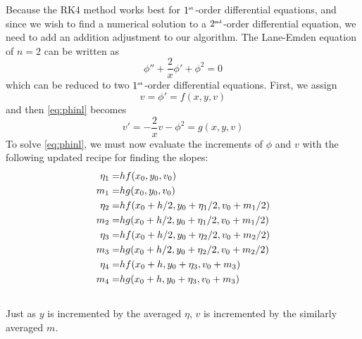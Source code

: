 \documentclass[12pt, manuscript]{article}
\begin{document}
    \noindent Because the RK4 method works best for $1^{\text{\tiny{st}}}$-order differential equations, and since we wish to find a numerical solution to a $2^{\text{\tiny{nd}}}$-order differential equation, we need to add an addition adjustment to our algorithm. The Lane-Emden equation of $n = 2$ can be written as 
    \begin{equation}\label{eq:phinl}
        \phi'' + \frac{2}{x}\phi' + \phi^2 = 0
    \end{equation} 
    which can be reduced to two $1^{\text{\tiny{st}}}$-order differential equations.  First, we assign 
        \begin{equation}
            v = \phi' = f(x, y, v)
        \end{equation}
        and then \eqref{eq:phinl} becomes
        \begin{equation}
            v' = - \frac{2}{x}v - \phi^2 = g(x, y, v)
        \end{equation}
        To solve \eqref{eq:phinl}, we must now evaluate the increments of $\phi$ and $v$ with the following updated recipe \cite{lea} for finding the slopes:
        \begin{align}
            \eta_1 =& hf(x_0, y_0, v_0) \notag \\ 
            m_1 =& hg(x_0, y_0, v_0)\notag \\ 
            \eta_2 =& hf(x_0 + h/2, y_0 + \eta_1/2, v_0 + m_1/2)\notag \\
            m_2 =& hg(x_0+h/2, y_0 + \eta_1/2, v_0 + m_1/2) \notag\\
            \eta_3 =& hf(x_0 + h/2, y_0 + \eta_2/2, v_0 + m_2/2) \label{eq:algor}\\
            m_3 =& hg(x_0+h/2, y_0 + \eta_2/2, v_0 + m_2/2) \notag \\
            \eta_4 =& hf(x_0 + h, y_0 + \eta_3, v_0 + m_3) \notag\\
            m_4 =& hg(x_0+h, y_0 + \eta_3, v_0 + m_3)\notag\\ \notag
        \end{align}
        Just as $y$ is incremented by the averaged $\eta$, $v$ is incremented by the similarly averaged $m$.
\end{document}

